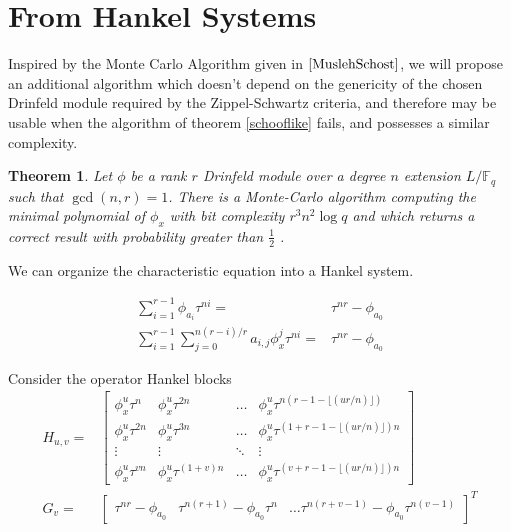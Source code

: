 \documentclass[sigconf]{acmart}
\newtheorem{theorem}{Theorem}
\newcommand{\F}{\mathbb{F}}
\begin{document}





\section{From Hankel Systems}
Inspired by the Monte Carlo Algorithm given in $\cite{MuslehSchost}$, we will propose an additional algorithm which doesn't depend on the genericity of the chosen Drinfeld module required by the Zippel-Schwartz criteria, and therefore may be usable when the algorithm of theorem \ref{schooflike} fails, and possesses a similar complexity.
\begin{theorem}\label{hankel}
Let $\phi$ be a rank $r$ Drinfeld module over a degree $n$ extension $L/\F_q$ such that $\gcd(n, r) = 1$. There is a Monte-Carlo algorithm computing the minimal polynomial of $\phi_x$ with bit complexity $r^{3}n^2 \log q$ and which returns a correct result with probability greater than $\frac{1}{2}$ .
\end{theorem}

 We can organize the characteristic equation into a Hankel system.

\begin{align*}
\sum_{i=1}^{r - 1} \phi_{a_i}\tau^{ni} = &  \tau^{nr} - \phi_{a_0}
\\
\sum_{i=1}^{r - 1} \sum_{j=0}^{n(r-i)/r}a_{i,j}\phi_{x}^j\tau^{ni} = & \tau^{nr} - \phi_{a_0}
\end{align*}

Consider the operator Hankel blocks
\begin{align*}
H_{u,v} = & \begin{bmatrix}
\phi_x^u\tau^{n} & \phi_x^u\tau^{2n} & \ldots & \phi_x^u\tau^{n (r - 1 - \lfloor(ur/n) \rfloor)} \\
\phi_x^u\tau^{2n} & \phi_x^u\tau^{3n} & \ldots & \phi_x^u\tau^{(1 + r - 1 - \lfloor(ur/n) \rfloor)n} \\ \vdots & \vdots & \ddots & \vdots \\ \phi_x^u\tau^{vn} & \phi_x^u\tau^{(1+v)n} & \ldots & \phi_x^u\tau^{(v +  r - 1 - \lfloor(ur/n) \rfloor) n}
\end{bmatrix}
\\
    G_{v} = &\begin{bmatrix}
    \tau^{nr} - \phi_{a_0} & \tau^{n(r+1)} - \phi_{a_0}\tau^n & \ldots \tau^{n(r+v -1)} - \phi_{a_0}\tau^{n(v-1)}
    \end{bmatrix}^T
\end{align*}
\end{document}
